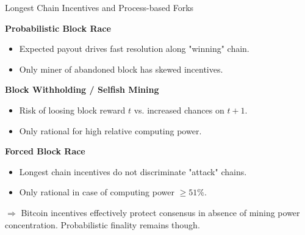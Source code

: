 \documentclass[handout]{beamer}
\begin{document}
\begin{frame}{Longest Chain Incentives and Process-based Forks}

\textbf{Probabilistic Block Race}
\begin{itemize}
	\item	Expected payout drives fast resolution along "winning" chain. 
	\item	Only miner of abandoned block has skewed incentives.
\end{itemize}

\vspace{0.5 em}

\textbf{Block Withholding / Selfish Mining}
\begin{itemize}
	\item	Risk of loosing block reward $t$ vs. increased chances on $t+1$.
	\item	Only rational for high relative computing power.
\end{itemize}

\vspace{0.5 em}

\textbf{Forced Block Race}
\begin{itemize}
	\item	Longest chain incentives do not discriminate "attack" chains.
	\item	Only rational in case of computing power $\ge 51\%$.
\end{itemize}

\vspace{1.0 em}

$\Rightarrow$ Bitcoin incentives effectively protect consensus in absence of mining power concentration. Probabilistic finality remains though.

\end{frame}
\end{document}
